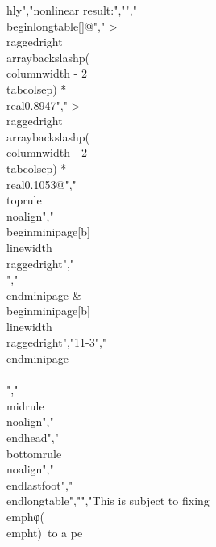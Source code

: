 {{{{{{{hly","nonlinear result:","","\\begin{longtable}[]{@{}","  >{\\raggedright\\arraybackslash}p{(\\columnwidth - 2\\tabcolsep) * \\real{0.8947}}","  >{\\raggedright\\arraybackslash}p{(\\columnwidth - 2\\tabcolsep) * \\real{0.1053}}@{}}","\\toprule\\noalign{}","\\begin{minipage}[b]{\\linewidth}\\raggedright","\\[\\begin{array}{r}","\\zeta(t) = \\sin(\\sqrt{A}\\sum_{i = 1}^{i = N}{k_{i}\\sin(\\omega_{i}t) + \\theta_{0})}","\\end{array}\\]","\\end{minipage} & \\begin{minipage}[b]{\\linewidth}\\raggedright","11-3","\\end{minipage} \\\\","\\midrule\\noalign{}","\\endhead","\\bottomrule\\noalign{}","\\endlastfoot","\\end{longtable}","","This is subject to fixing \\emph{φ}(\\emph{t})~to a pe}}}}}}}
